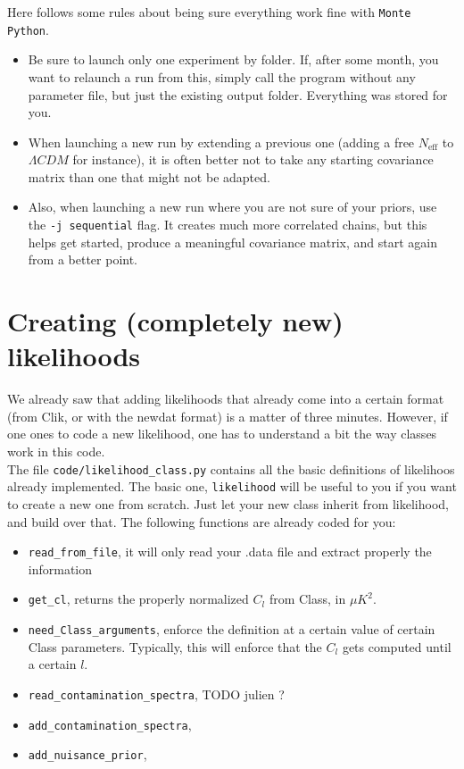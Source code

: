 \documentclass[10pt]{article}
\newcommand{\MP}{\texttt{Monte Python}}
\begin{document}
  Here follows some rules about being sure everything work fine with \MP.
\begin{itemize}
  \item Be sure to launch only one experiment by folder. If, after some month,
    you want to relaunch a run from this, simply call the program without any
    parameter file, but just the existing output folder. Everything was stored for you.
  \item When launching a new run by extending a previous one (adding a free
    $N_{\textrm{eff}}$ to $\Lambda CDM$ for instance), it is often better not to
    take any starting covariance matrix than one that might not be adapted.
  \item Also, when launching a new run where you are not sure of your priors,
    use the \verb?-j sequential? flag. It creates much more correlated chains,
    but this helps get started, produce a meaningful covariance matrix, and
    start again from a better point.
\end{itemize}
\newpage
\section{Creating (completely new) likelihoods}

  We already saw that adding likelihoods that already come into a certain format
  (from Clik, or with the newdat format) is a matter of three minutes. However,
  if one ones to code a new likelihood, one has to understand a bit the way
  classes work in this code.\\

  The file \verb?code/likelihood_class.py? contains all the basic definitions
  of likelihoos already implemented. The basic one, \verb?likelihood? will be
  useful to you if you want to create a new one from scratch. Just let your new
  class inherit from likelihood, and build over that. The following functions are already coded for you:\\

  \begin{itemize}
    \item \verb?read_from_file?, it will only read your .data file and extract
      properly the information
    \item \verb?get_cl?, returns the properly normalized $C_l$ from Class, in $\mu K^2$.
    \item \verb?need_Class_arguments?, enforce the definition at a certain
      value of certain Class parameters. Typically, this will enforce that the
      $C_l$ gets computed until a certain $l$.
    \item \verb?read_contamination_spectra?, TODO julien ?
    \item \verb?add_contamination_spectra?,
    \item \verb?add_nuisance_prior?,
  \end{itemize}
\end{document}
